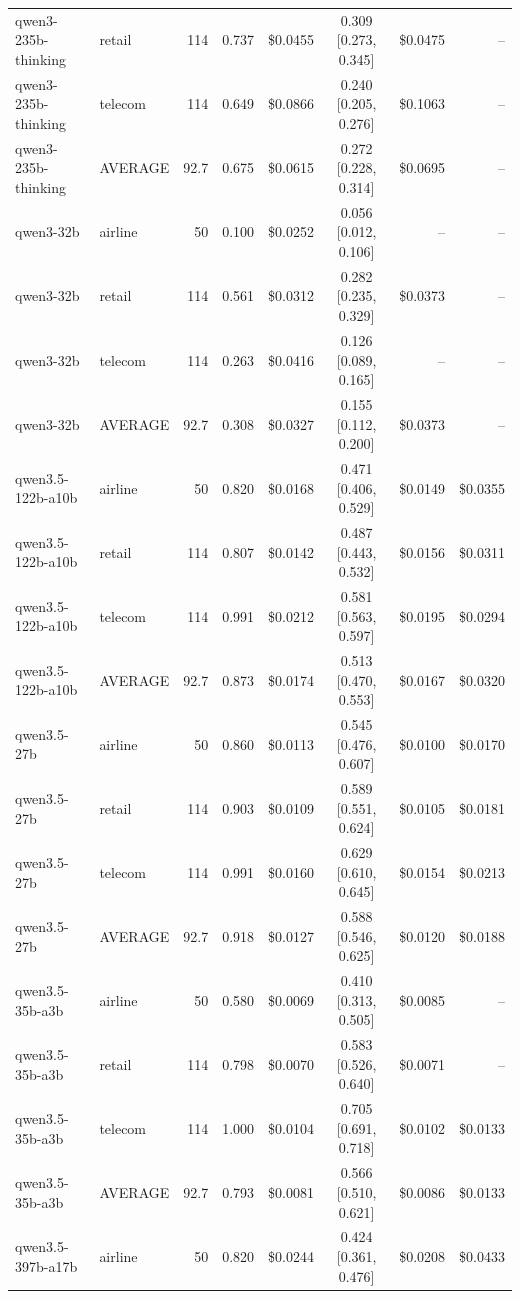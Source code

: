 \documentclass[preprint,authoryear,12pt]{elsarticle}
\begin{document}
\begin{table}[h]
{\begin{tabular}{l l r r r c r r}
qwen3-235b-thinking & retail & 114 & 0.737 & \$0.0455 & 0.309 [0.273, 0.345] & \$0.0475 & -- \\
qwen3-235b-thinking & telecom & 114 & 0.649 & \$0.0866 & 0.240 [0.205, 0.276] & \$0.1063 & -- \\
qwen3-235b-thinking & AVERAGE & 92.7 & 0.675 & \$0.0615 & 0.272 [0.228, 0.314] & \$0.0695 & -- \\
\midrule
qwen3-32b & airline & 50 & 0.100 & \$0.0252 & 0.056 [0.012, 0.106] & -- & -- \\
qwen3-32b & retail & 114 & 0.561 & \$0.0312 & 0.282 [0.235, 0.329] & \$0.0373 & -- \\
qwen3-32b & telecom & 114 & 0.263 & \$0.0416 & 0.126 [0.089, 0.165] & -- & -- \\
qwen3-32b & AVERAGE & 92.7 & 0.308 & \$0.0327 & 0.155 [0.112, 0.200] & \$0.0373 & -- \\
\midrule
qwen3.5-122b-a10b & airline & 50 & 0.820 & \$0.0168 & 0.471 [0.406, 0.529] & \$0.0149 & \$0.0355 \\
qwen3.5-122b-a10b & retail & 114 & 0.807 & \$0.0142 & 0.487 [0.443, 0.532] & \$0.0156 & \$0.0311 \\
qwen3.5-122b-a10b & telecom & 114 & 0.991 & \$0.0212 & 0.581 [0.563, 0.597] & \$0.0195 & \$0.0294 \\
qwen3.5-122b-a10b & AVERAGE & 92.7 & 0.873 & \$0.0174 & 0.513 [0.470, 0.553] & \$0.0167 & \$0.0320 \\
\midrule
qwen3.5-27b & airline & 50 & 0.860 & \$0.0113 & 0.545 [0.476, 0.607] & \$0.0100 & \$0.0170 \\
qwen3.5-27b & retail & 114 & 0.903 & \$0.0109 & 0.589 [0.551, 0.624] & \$0.0105 & \$0.0181 \\
qwen3.5-27b & telecom & 114 & 0.991 & \$0.0160 & 0.629 [0.610, 0.645] & \$0.0154 & \$0.0213 \\
qwen3.5-27b & AVERAGE & 92.7 & 0.918 & \$0.0127 & 0.588 [0.546, 0.625] & \$0.0120 & \$0.0188 \\
\midrule
qwen3.5-35b-a3b & airline & 50 & 0.580 & \$0.0069 & 0.410 [0.313, 0.505] & \$0.0085 & -- \\
qwen3.5-35b-a3b & retail & 114 & 0.798 & \$0.0070 & 0.583 [0.526, 0.640] & \$0.0071 & -- \\
qwen3.5-35b-a3b & telecom & 114 & 1.000 & \$0.0104 & 0.705 [0.691, 0.718] & \$0.0102 & \$0.0133 \\
qwen3.5-35b-a3b & AVERAGE & 92.7 & 0.793 & \$0.0081 & 0.566 [0.510, 0.621] & \$0.0086 & \$0.0133 \\
\midrule
qwen3.5-397b-a17b & airline & 50 & 0.820 & \$0.0244 & 0.424 [0.361, 0.476] & \$0.0208 & \$0.0433 \\

\end{tabular}}
\end{table}
\end{document}
